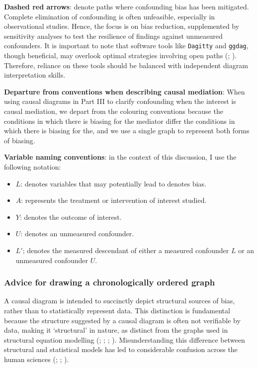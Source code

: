 \documentclass[
  singlecolumn,
  9pt]{article}
\providecommand{\tightlist}{%
  \setlength{\itemsep}{0pt}\setlength{\parskip}{0pt}}\usepackage{longtable,booktabs,array}
\begin{document}
\textbf{Dashed red arrows}: denote paths where confounding bias has been
mitigated. Complete elimination of confounding is often unfeasible,
especially in observational studies. Hence, the focus is on bias
reduction, supplemented by sensitivity analyses to test the resilience
of findings against unmeasured confounders. It is important to note that
software tools like \texttt{Dagitty} and \texttt{ggdag}, though
beneficial, may overlook optimal strategies involving open paths
(;
). Therefore,
reliance on these tools should be balanced with independent diagram
interpretation skills.

\textbf{Departure from conventions when describing causal mediation}:
When using causal diagrams in Part III to clarify confounding when the
interest is causal mediation, we depart from the colouring conventions
because the conditions in which there is biasing for the mediator differ
the conditions in which there is biasing for the, and we use a single
graph to represent both forms of biasing.

\textbf{Variable naming conventions}: in the context of this discussion,
I use the following notation:

\begin{itemize}
\tightlist
\item
  \(L\): denotes variables that may potentially lead to denotes bias.
\item
  \(A\): represents the treatment or intervention of interest studied.
\item
  \(Y\): denotes the outcome of interest.
\item
  \(U\): denotes an unmeasured confounder.
\item
  \(L'\); denotes the measured descendant of either a measured
  confounder \(L\) or an unmeasured confounder \(U\).
\end{itemize}

\subsubsection{Advice for drawing a chronologically ordered
graph}\label{advice-for-drawing-a-chronologically-ordered-graph}

A causal diagram is intended to succinctly depict structural sources of
bias, rather than to statistically represent data. This distinction is
fundamental because the structure suggested by a causal diagram is often
not verifiable by data, making it `structural' in nature, as distinct
from the graphs used in structural equation modelling
(;
;
;
). Misunderstanding this
difference between structural and statistical models has led to
considerable confusion across the human sciences
(;
;
).
\end{document}
